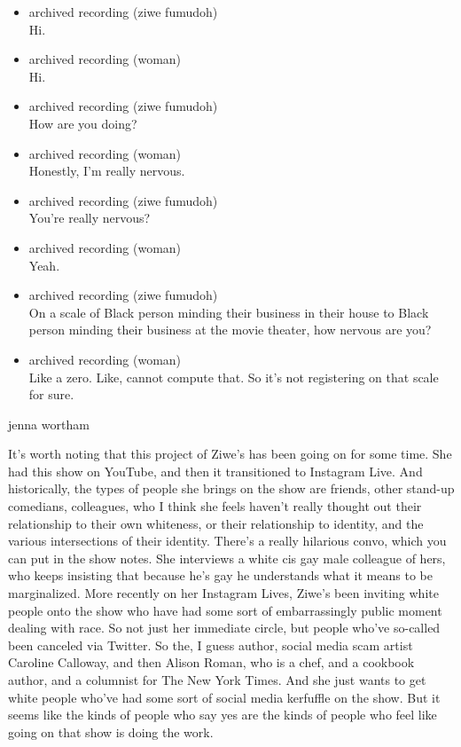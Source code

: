 \begin{itemize}
\item
  archived recording (ziwe fumudoh)\\
  Hi.
\item
  archived recording (woman)\\
  Hi.
\item
  archived recording (ziwe fumudoh)\\
  How are you doing?
\item
  archived recording (woman)\\
  Honestly, I'm really nervous.
\item
  archived recording (ziwe fumudoh)\\
  You're really nervous?
\item
  archived recording (woman)\\
  Yeah.
\item
  archived recording (ziwe fumudoh)\\
  On a scale of Black person minding their business in their house to
  Black person minding their business at the movie theater, how nervous
  are you?
\item
  archived recording (woman)\\
  Like a zero. Like, cannot compute that. So it's not registering on
  that scale for sure.
\end{itemize}

jenna wortham

It's worth noting that this project of Ziwe's has been going on for some
time. She had this show on YouTube, and then it transitioned to
Instagram Live. And historically, the types of people she brings on the
show are friends, other stand-up comedians, colleagues, who I think she
feels haven't really thought out their relationship to their own
whiteness, or their relationship to identity, and the various
intersections of their identity. There's a really hilarious convo, which
you can put in the show notes. She interviews a white cis gay male
colleague of hers, who keeps insisting that because he's gay he
understands what it means to be marginalized. More recently on her
Instagram Lives, Ziwe's been inviting white people onto the show who
have had some sort of embarrassingly public moment dealing with race. So
not just her immediate circle, but people who've so-called been canceled
via Twitter. So the, I guess author, social media scam artist Caroline
Calloway, and then Alison Roman, who is a chef, and a cookbook author,
and a columnist for The New York Times. And she just wants to get white
people who've had some sort of social media kerfuffle on the show. But
it seems like the kinds of people who say yes are the kinds of people
who feel like going on that show is doing the work.

